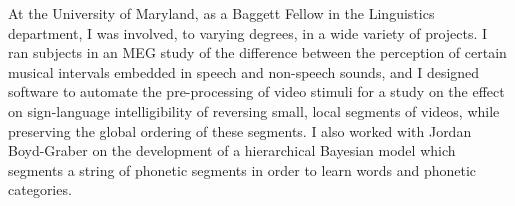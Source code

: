 \documentclass[12pt]{article}
\begin{document}

At the University of Maryland, as a Baggett Fellow in the Linguistics department, I was involved, to varying degrees, in a wide variety of projects.  I ran subjects in an MEG study of the difference between the perception of certain musical intervals embedded in speech and non-speech sounds, and I designed software to automate the pre-processing of video stimuli for a study on the effect on sign-language intelligibility of reversing small, local segments of videos, while preserving the global ordering of these segments.  I also worked with Jordan Boyd-Graber on the development of a hierarchical Bayesian model which segments a string of phonetic segments in order to learn words and phonetic categories.
\end{document}
